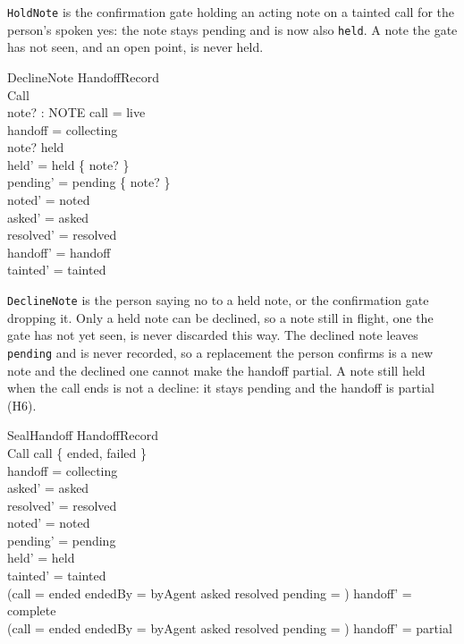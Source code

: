 \documentclass[a4paper,10pt,fleqn]{article}
\begin{document}
\texttt{HoldNote} is the confirmation gate holding an acting note on a
tainted call for the person's spoken yes: the note stays pending and is now
also \texttt{held}. A note the gate has not seen, and an open point, is never
held.

\begin{schema}{DeclineNote}
  \Delta HandoffRecord \\
  Call \\
  note? : NOTE
\where
  call = live \\
  handoff = collecting \\
  note? \in held \\
  held' = held \setminus \{ note? \} \\
  pending' = pending \setminus \{ note? \} \\
  noted' = noted \\
  asked' = asked \\
  resolved' = resolved \\
  handoff' = handoff \\
  tainted' = tainted
\end{schema}

\texttt{DeclineNote} is the person saying no to a held note, or the
confirmation gate dropping it. Only a held note can be declined, so a note
still in flight, one the gate has not yet seen, is never discarded this way.
The declined note leaves \texttt{pending} and is never recorded, so a
replacement the person confirms is a new note and the declined one cannot
make the handoff partial. A note still held when the call ends is not a
decline: it stays pending and the handoff is partial (H6).

\begin{schema}{SealHandoff}
  \Delta HandoffRecord \\
  \Xi Call
\where
  call \in \{ ended, failed \} \\
  handoff = collecting \\
  asked' = asked \\
  resolved' = resolved \\
  noted' = noted \\
  pending' = pending \\
  held' = held \\
  tainted' = tainted \\
  (call = ended \land endedBy = byAgent \land asked \subseteq resolved
    \land pending = \emptyset) \implies handoff' = complete \\
  \lnot (call = ended \land endedBy = byAgent \land asked \subseteq resolved
    \land pending = \emptyset) \implies handoff' = partial
\end{schema}
\end{document}
